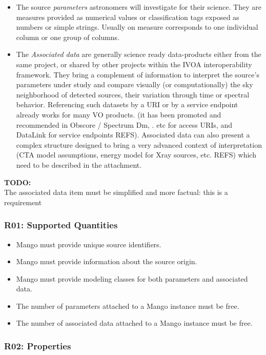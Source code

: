 \documentclass[11pt,a4paper]{ivoa}
\newcommand{\TODO}[1]{%
    \noindent%
    \colorbox{todocolor}{%
            \parbox{0.85\linewidth}{\sffamily \textbf{TODO:}\\
            #1}
    }%
    \vspace{2pt}

}
\begin{document}
\begin{itemize}
    \item The source \emph{parameters} astronomers will investigate for their science.
          They are measures provided as numerical values or classification tags exposed as
          numbers or simple strings. 
          Usually on measure corresponds to one individual column or one group of columns.
    \item The \emph{Associated data} are generally science ready data-products either from the
          same project, or shared by other projects within the IVOA interoperability framework.
          They bring a complement of information to interpret the source's  parameters under
          study and compare visually (or computationally) the sky neighborhood of detected sources,
          their variation through time or spectral behavior.
          Referencing such datasets by a URI or by a service endpoint already works for many VO products.
          (it has been promoted and recommended in Obscore / Spectrum Dm, . etc for access URIs, and 
          DataLink for service endpoints REFS).
          Associated data can also present a complex structure designed to bring a very advanced context
          of interpretation (CTA model assumptions, energy model for Xray sources, etc. REFS)
          which need to be described in the attachment.
 \end{itemize}
 
\TODO{The associated data item must be simplified and more factual: this is a requirement}
 

\subsubsection{R01: Supported Quantities}
\begin{itemize}
    \item Mango must provide unique source identifiers.
    \item Mango must provide information about the source origin.
    \item Mango must provide modeling classes for both parameters and associated data.
    \item The number of parameters attached to a Mango instance must be free.
    \item The number of associated data attached to a Mango instance must be free.
\end{itemize}

\subsubsection{R02: Properties}
\end{document}

